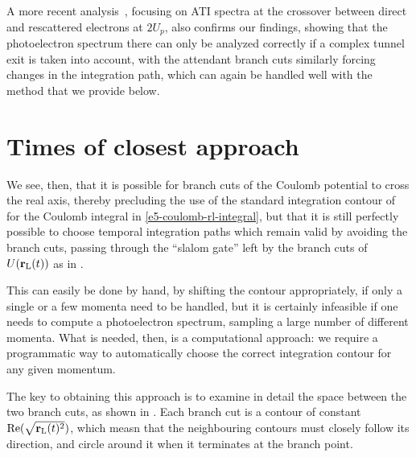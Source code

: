 A more recent analysis~\cite{keil_branch-cuts_2016}, focusing on ATI spectra at the crossover between direct and rescattered electrons at $2U_p$, also confirms our findings, showing that the photoelectron spectrum there can only be analyzed correctly if a complex tunnel exit is taken into account, with the attendant branch cuts similarly forcing changes in the integration path, which can again be handled well with the method that we provide below.












\section{Times of closest approach}
\label{sec:times-of-closest-approach}
We see, then, that it is possible for branch cuts of the Coulomb potential to cross the real axis, thereby precluding the use of the standard integration contour of  for the Coulomb integral in \eqref{e5-coulomb-rl-integral}, but that it is still perfectly possible to choose temporal integration paths which remain valid by avoiding the branch cuts, passing through the ``slalom gate'' left by the branch cuts of $U(\vb{r}_\mathrm{L}(t))$ as in .

This can easily be done by hand, by shifting the contour appropriately, if only a single or a few momenta need to be handled, but it is certainly infeasible if one needs to compute a photoelectron spectrum, sampling a large number of different momenta. What is needed, then, is a computational approach: we require a programmatic way to automatically choose the correct integration contour for any given momentum.

The key to obtaining this approach is to examine in detail the space between the two branch cuts, as shown in . Each branch cut is a contour of constant $\Re(\sqrt{\vb{r}_\mathrm{L}(t)^2})$, which measn that the neighbouring contours must closely follow its direction, and circle around it when it terminates at the branch point. 

